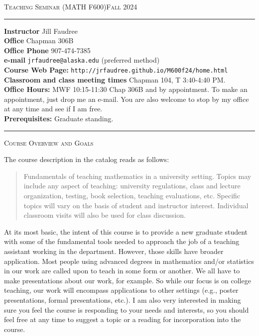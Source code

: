 \documentclass[12pt]{article}
\begin{document}
\normalem
\begin{center}
 \textsc{Teaching Seminar (MATH F600)\hfill Fall 2024}
\end{center}

\rule{\textwidth}{.1pt}

\textbf{Instructor} Jill Faudree\\
\textbf{Office} Chapman 306B\\
\textbf{Office Phone} 907-474-7385\\
\textbf{e-mail} {\tt jrfaudree@alaska.edu} (preferred method)\\
\textbf{Course Web Page:} {\tt http://jrfaudree.github.io/M600f24/home.html}\\
\textbf{Classroom and class meeting times} Chapman 104, T 3:40-4:40 PM. \\
\textbf{Office Hours:}  MWF 10:15-11:30 Chap 306B and by appointment. To make an appointment, just drop me an e-mail. You are also welcome to stop by my office at any time and see if I am free.\\
\textbf{Prerequisites:} Graduate standing.

\rule{\textwidth}{.1pt}  

\textsc{Course Overview and Goals} 

The course description in the catalog reads as follows:
\begin{quote}Fundamentals of teaching mathematics in a university setting. Topics may include any aspect of teaching: university regulations, class and lecture organization, testing, book selection, teaching evaluations, etc. Specific topics will vary on the basis of student and instructor interest. Individual classroom visits will also be used for class discussion.\end{quote}
At its most basic, the intent of this course is to provide a new graduate student with some of the fundamental tools needed to approach the job of a teaching assistant working in the department. However, those skills have broader application. Most people using advanced degrees in mathematics and/or statistics in our work are called upon to teach in some form or another. We all have to make presentations about our work, for example. So while our focus is on college teaching, our work will encompass  applications to other settings (e.g., poster presentations, formal presentations, etc.). I am also very interested in making sure you feel the course is responding to your needs and interests, so you should feel free at any time to suggest a topic or a reading for incorporation into the course.
 
\end{document}
